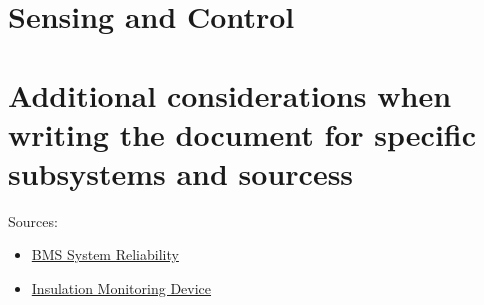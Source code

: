 \section{Sensing and Control}


\section{Additional considerations when writing the document for specific subsystems and sourcess}
Sources:
\begin{itemize}
    \item \href{https://link.springer.com/article/10.1007/s40789-022-00494-0}{BMS System Reliability}
    \item \href{https://www.sciencedirect.com/science/article/pii/S235248471930106X}{Insulation Monitoring Device} %
\end{itemize}

\newpage
